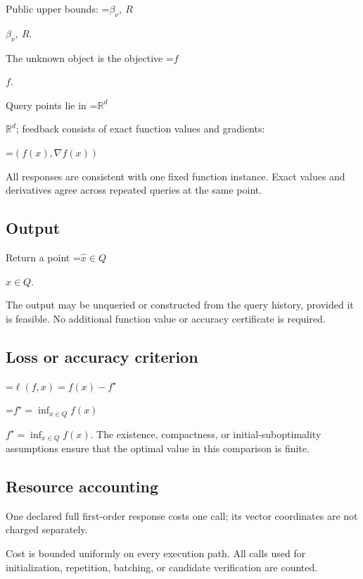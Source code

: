 \documentclass[10pt,a4paper]{article}
\newcommand{\AtlasMath}[1]{\par\begingroup\centering\setbox0=\hbox{$\displaystyle #1$}\ifdim\wd0>1.4\linewidth\typeout{ATLAS WIDE FORMULA: \the\wd0}\fi\ifdim\wd0>\linewidth\resizebox{\linewidth}{!}{\box0}\else\box0\fi\par\endgroup}
\newcommand{\AtlasInlineMath}[1]{\begingroup\setbox0=\hbox{$#1$}\ifdim\wd0>.4\linewidth\endgroup\AtlasMath{#1}\else\endgroup$#1$\fi}
\begin{document}
Public upper bounds: \AtlasInlineMath{\beta_\nu,\ R}.



The unknown object is the objective \AtlasInlineMath{f}.



Query points lie in \AtlasInlineMath{\mathbb{R}^d}; feedback consists of exact function values and gradients:




\AtlasMath{(f(x),\nabla f(x))}




All responses are consistent with one fixed function instance. Exact values and derivatives agree across repeated queries at the same point.



\subsection{Output}


Return a point \AtlasInlineMath{\widehat x\in Q}.



The output may be unqueried or constructed from the query history, provided it is feasible. No additional function value or accuracy certificate is required.



\subsection{Loss or accuracy criterion}



\AtlasMath{\ell(f,x)=f(x)-f^\star}




\AtlasInlineMath{f^\star=\inf_{x\in Q}f(x)}. The existence, compactness, or initial-suboptimality assumptions ensure that the optimal value in this comparison is finite.



\subsection{Resource accounting}


One declared full first-order response costs one call; its vector coordinates are not charged separately.



Cost is bounded uniformly on every execution path. All calls used for initialization, repetition, batching, or candidate verification are counted.
\end{document}
